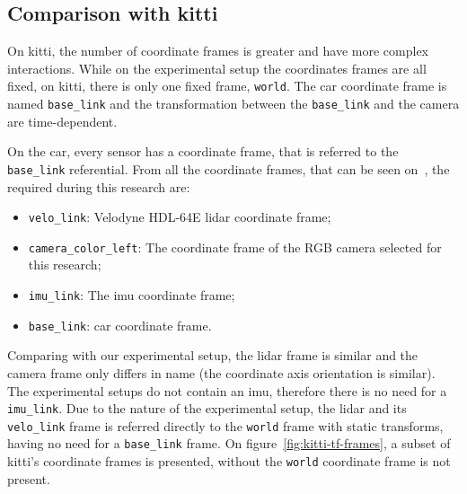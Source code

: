 \subsection{Comparison with \ac{kitti}}
\label{subsec:calibration:kitti-comparision}

On \ac{kitti}, the number of coordinate frames is greater and have more complex interactions. While on the experimental setup the coordinates frames are all fixed, on \ac{kitti}, there is only one fixed frame, \texttt{world}. The car coordinate frame is named \texttt{base\_link} and the transformation between the \texttt{base\_link} and the camera are time-dependent.

On the car, every sensor has a coordinate frame, that is referred to the \texttt{base\_link} referential. From all the coordinate frames, that can be seen on~\cite{Geiger2013a}, the required during this research are:

\begin{itemize}
	\item \texttt{velo\_link}: Velodyne HDL-64E \ac{lidar} coordinate frame;
	\item \texttt{camera\_color\_left}: The coordinate frame of the RGB camera selected for this research;
	\item \texttt{imu\_link}: The \ac{imu} coordinate frame;
	\item \texttt{base\_link}: car coordinate frame.
\end{itemize}

Comparing with our experimental setup, the \ac{lidar} frame is similar and the camera frame only differs in name (the coordinate axis orientation is similar). The experimental setups do not contain an \ac{imu}, therefore there is no need for a \texttt{imu\_link}. Due to the nature of the experimental setup, the \ac{lidar} and its \texttt{velo\_link} frame is referred directly to the \texttt{world} frame with static transforms, having no need for a \texttt{base\_link} frame. On figure~\ref{fig:kitti-tf-frames}, a subset of \ac{kitti}'s coordinate frames is presented, without the \texttt{world} coordinate frame is not present. 

